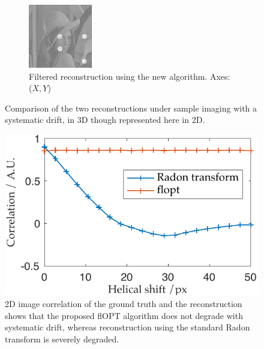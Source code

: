 \begin{figure}
\begin{subfigure}[t]{0.3\textwidth}
    \includegraphics[width=\textwidth]{Chapters/flopt/Figs/PDF/results/helix/filtered_recon_helix}
    \caption{Filtered reconstruction using the new algorithm. Axes: (\(X,Y\))}
    \label{fig:filtered_recon_helix}
  \end{subfigure}
    \hfill
    \label{fig:flopts}
  \caption{Comparison of the two reconstructions under sample imaging with a systematic drift, in 3D though represented here in 2D.}
\end{figure}
\begin{figure}
  \centering
  \includegraphics{Chapters/flopt/Figs/PDF/results/correlation_helicity}
  \caption{%
  2D image correlation of the ground truth and the reconstruction shows that the proposed flOPT algorithm does not degrade with systematic drift, whereas reconstruction using the standard \gls{Radon transform} is severely degraded.
  }\label{fig:helical_comparison}
\end{figure}

